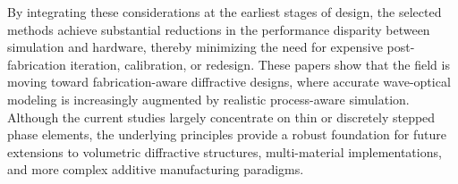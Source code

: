 \documentclass[12pt]{article}
\begin{document}
By integrating these considerations at the earliest stages of design, the selected methods achieve substantial reductions in the performance disparity between simulation and hardware, thereby minimizing the need for expensive post-fabrication iteration, calibration, or redesign. These papers show that the field is moving toward fabrication-aware diffractive designs, where accurate wave-optical modeling is increasingly augmented by realistic process-aware simulation. Although the current studies largely concentrate on thin or discretely stepped phase elements, the underlying principles provide a robust foundation for future extensions to volumetric diffractive structures, multi-material implementations, and more complex additive manufacturing paradigms.
































\end{document}
